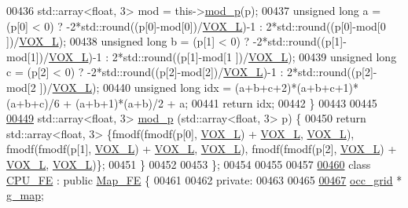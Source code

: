 \begin{DoxyCode}
00436         std::array<float, 3> mod = this->\hyperlink{Voxel_8cuh_abbd51b1d8c2bc9b7d5ef5413e1e4ca49}{mod\_p}(p);
00437         \textcolor{keywordtype}{unsigned} \textcolor{keywordtype}{long} a = (p[0] < 0) ? -2*std::round((p[0]-mod[0])/\hyperlink{Voxel_8hpp_a3c1c8b966e30fa8ca2de07abe3b3d74a}{VOX\_L})-1 : 2*std::round((p[0]-mod[0
      ])/\hyperlink{Voxel_8hpp_a3c1c8b966e30fa8ca2de07abe3b3d74a}{VOX\_L});
00438         \textcolor{keywordtype}{unsigned} \textcolor{keywordtype}{long} b = (p[1] < 0) ? -2*std::round((p[1]-mod[1])/\hyperlink{Voxel_8hpp_a3c1c8b966e30fa8ca2de07abe3b3d74a}{VOX\_L})-1 : 2*std::round((p[1]-mod[1
      ])/\hyperlink{Voxel_8hpp_a3c1c8b966e30fa8ca2de07abe3b3d74a}{VOX\_L});
00439         \textcolor{keywordtype}{unsigned} \textcolor{keywordtype}{long} c = (p[2] < 0) ? -2*std::round((p[2]-mod[2])/\hyperlink{Voxel_8hpp_a3c1c8b966e30fa8ca2de07abe3b3d74a}{VOX\_L})-1 : 2*std::round((p[2]-mod[2
      ])/\hyperlink{Voxel_8hpp_a3c1c8b966e30fa8ca2de07abe3b3d74a}{VOX\_L});
00440         \textcolor{keywordtype}{unsigned} \textcolor{keywordtype}{long} idx = (a+b+c+2)*(a+b+c+1)*(a+b+c)/6 + (a+b+1)*(a+b)/2 + a;
00441         \textcolor{keywordflow}{return} idx;
00442     \}
00443 
00445 
\hypertarget{Voxel_8hpp_source.tex_l00449}{}\hyperlink{classocc__grid_abf7ece8bcafa68e1292b0be52a5d9996}{00449}     std::array<float, 3> \hyperlink{classocc__grid_abf7ece8bcafa68e1292b0be52a5d9996}{mod\_p} (std::array<float, 3> p) \{
00450         \textcolor{keywordflow}{return} std::array<float, 3> \{fmodf(fmodf(p[0], \hyperlink{Voxel_8hpp_a3c1c8b966e30fa8ca2de07abe3b3d74a}{VOX\_L}) + \hyperlink{Voxel_8hpp_a3c1c8b966e30fa8ca2de07abe3b3d74a}{VOX\_L}, 
      \hyperlink{Voxel_8hpp_a3c1c8b966e30fa8ca2de07abe3b3d74a}{VOX\_L}), fmodf(fmodf(p[1], \hyperlink{Voxel_8hpp_a3c1c8b966e30fa8ca2de07abe3b3d74a}{VOX\_L}) + \hyperlink{Voxel_8hpp_a3c1c8b966e30fa8ca2de07abe3b3d74a}{VOX\_L}, \hyperlink{Voxel_8hpp_a3c1c8b966e30fa8ca2de07abe3b3d74a}{VOX\_L}), fmodf(fmodf(p[2], 
      \hyperlink{Voxel_8hpp_a3c1c8b966e30fa8ca2de07abe3b3d74a}{VOX\_L}) + \hyperlink{Voxel_8hpp_a3c1c8b966e30fa8ca2de07abe3b3d74a}{VOX\_L}, \hyperlink{Voxel_8hpp_a3c1c8b966e30fa8ca2de07abe3b3d74a}{VOX\_L})\};
00451     \}
00452 
00453 \};
00454 
00455 
00457 
\hypertarget{Voxel_8hpp_source.tex_l00460}{}\hyperlink{classCPU__FE}{00460} \textcolor{keyword}{class }\hyperlink{classCPU__FE}{CPU\_FE} : \textcolor{keyword}{public} \hyperlink{classMap__FE}{Map\_FE} \{
00461 
00462 \textcolor{keyword}{private}:
00463 
00465 
\hypertarget{Voxel_8hpp_source.tex_l00467}{}\hyperlink{classCPU__FE_ad3779fc0a23127e425d8f0fc3c2661dc}{00467}     \hyperlink{classocc__grid}{occ\_grid} * \hyperlink{classCPU__FE_ad3779fc0a23127e425d8f0fc3c2661dc}{g\_map};

\end{DoxyCode}
